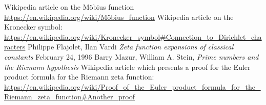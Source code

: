 \documentclass{article}
\theoremstyle{definition}
\theoremstyle{remark}
\begin{document}
\begin{thebibliography}{9}
Wikipedia article on the Möbius function \url{https://en.wikipedia.org/wiki/Möbius_function}
 Wikipedia article on the Kronecker symbol: \url{https://en.wikipedia.org/wiki/Kronecker_symbol#Connection_to_Dirichlet_characters}
\label{refFlajolet} Philippe Flajolet, Ilan Vardi \textit{Zeta function expansions of classical constants} February 24, 1996
 Barry Mazur, William A. Stein,  \textit{Prime numbers and the Riemann hypothesis}
 Wikipedia article which presents a proof for the Euler product formula for the Riemann zeta function:
\url{https://en.wikipedia.org/wiki/Proof_of_the_Euler_product_formula_for_the_Riemann_zeta_function#Another_proof}
\end{thebibliography}
\end{document}
